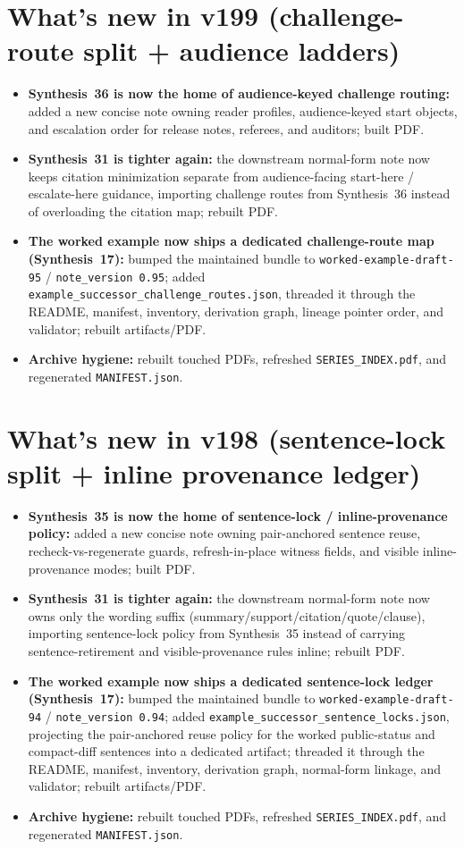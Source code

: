 \documentclass[11pt]{article}
\begin{document}
\section{What's new in v199 (challenge-route split + audience ladders)}
\begin{itemize}[leftmargin=*]
\item \textbf{Synthesis~36 is now the home of audience-keyed challenge routing:} added a new concise note owning reader profiles, audience-keyed start objects, and escalation order for release notes, referees, and auditors; built PDF.
\item \textbf{Synthesis~31 is tighter again:} the downstream normal-form note now keeps citation minimization separate from audience-facing start-here / escalate-here guidance, importing challenge routes from Synthesis~36 instead of overloading the citation map; rebuilt PDF.
\item \textbf{The worked example now ships a dedicated challenge-route map (Synthesis~17):} bumped the maintained bundle to \texttt{worked-example-draft-95} / \texttt{note\_version 0.95}; added \texttt{example\_successor\_challenge\_routes.json}, threaded it through the README, manifest, inventory, derivation graph, lineage pointer order, and validator; rebuilt artifacts/PDF.
\item \textbf{Archive hygiene:} rebuilt touched PDFs, refreshed \texttt{SERIES\_INDEX.pdf}, and regenerated \texttt{MANIFEST.json}.
\end{itemize}

\section{What's new in v198 (sentence-lock split + inline provenance ledger)}
\begin{itemize}[leftmargin=*]
\item \textbf{Synthesis~35 is now the home of sentence-lock / inline-provenance policy:} added a new concise note owning pair-anchored sentence reuse, recheck-vs-regenerate guards, refresh-in-place witness fields, and visible inline-provenance modes; built PDF.
\item \textbf{Synthesis~31 is tighter again:} the downstream normal-form note now owns only the wording suffix (summary/support/citation/quote/clause), importing sentence-lock policy from Synthesis~35 instead of carrying sentence-retirement and visible-provenance rules inline; rebuilt PDF.
\item \textbf{The worked example now ships a dedicated sentence-lock ledger (Synthesis~17):} bumped the maintained bundle to \texttt{worked-example-draft-94} / \texttt{note\_version 0.94}; added \texttt{example\_successor\_sentence\_locks.json}, projecting the pair-anchored reuse policy for the worked public-status and compact-diff sentences into a dedicated artifact; threaded it through the README, manifest, inventory, derivation graph, normal-form linkage, and validator; rebuilt artifacts/PDF.
\item \textbf{Archive hygiene:} rebuilt touched PDFs, refreshed \texttt{SERIES\_INDEX.pdf}, and regenerated \texttt{MANIFEST.json}.
\end{itemize}
\end{document}
